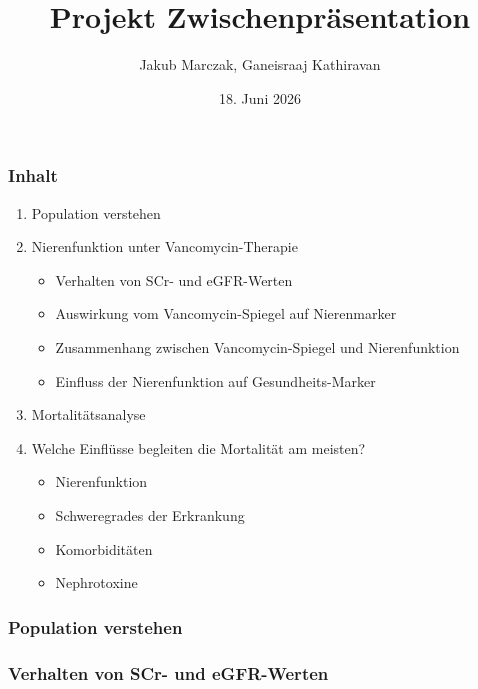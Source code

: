 \documentclass[10pt, aspectratio=169]{beamer}
\date{18. Juni 2026}
\title{Projekt \MakeUppercase{\romannumeral 4} Zwischenpräsentation}
\author[J. Marczak, G. Kathiravan]{Jakub Marczak, Ganeisraaj Kathiravan}
\begin{document}
\begin{frame}[plain]
  \titlepage
\end{frame}

\begin{frame}
    \frametitle{Inhalt}
    \begin{enumerate}
        \item Population verstehen
        \item Nierenfunktion unter Vancomycin-Therapie
        \begin{itemize} 
        \item[$\rightarrow$] Verhalten von SCr- und eGFR-Werten
        \item[$\rightarrow$] Auswirkung vom Vancomycin-Spiegel auf Nierenmarker
        \item[$\rightarrow$] Zusammenhang zwischen Vancomycin-Spiegel und Nierenfunktion
        \item[$\rightarrow$] Einfluss der Nierenfunktion auf Gesundheits-Marker
      \end{itemize}
        \item Mortalitätsanalyse
        \item[$\rightarrow$] Welche Einflüsse begleiten die Mortalität am meisten?
        \begin{itemize}
            \item Nierenfunktion
            \item Schweregrades der Erkrankung
            \item Komorbiditäten
            \item Nephrotoxine
        \end{itemize}
    \end{enumerate}
\end{frame}

\begin{frame}
    \frametitle{Population verstehen}
\end{frame}

\begin{frame}
    \frametitle{Verhalten von SCr- und eGFR-Werten}
\end{frame}
\end{document}
